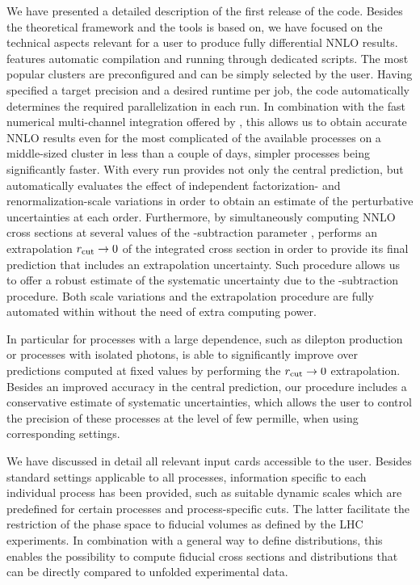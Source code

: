 \documentclass[english,11pt]{article}
\begin{document}
We have presented a detailed description of the first release of 
the \Matrix{} code. 
Besides the theoretical framework and the tools \Matrix{} is based on, we have 
focused on the technical aspects relevant for a user to produce fully differential 
NNLO results. \Matrix{} features automatic compilation and running through dedicated scripts. The most 
popular clusters are preconfigured and can be simply selected by the user. Having specified 
a target precision and a desired runtime per job, the code automatically determines
the required parallelization in each run. In combination with the fast numerical multi-channel 
integration offered by \Munich{}, this allows us
to obtain accurate NNLO results even for the most complicated 
of the available processes on a middle-sized cluster in less than a couple of days, 
simpler processes being significantly faster. With every run \Matrix{} provides not 
only the central prediction, but automatically evaluates the effect of independent factorization- and renormalization-scale 
variations in order to obtain an estimate of the perturbative uncertainties at each order.
Furthermore, by simultaneously computing NNLO cross sections at several values of the \qt{}-subtraction 
parameter \rcut{}, \Matrix{} performs an extrapolation $r_{\mathrm{cut}}\rightarrow 0$ of the integrated cross section 
in order to provide its final prediction that includes an extrapolation uncertainty.
Such procedure allows us to offer a robust estimate of the systematic uncertainty due to the \qt{}-subtraction procedure.
Both scale variations and the \rcut{} extrapolation procedure are fully automated within \Matrix{} 
without the need of extra computing power.

In particular for processes with a large \rcut{} dependence, such as dilepton production
or processes with isolated photons, 
\Matrix{} is able to significantly improve over predictions computed at fixed \rcut{} values by performing the $r_{\mathrm{cut}}\to 0$ extrapolation. 
Besides an improved accuracy in the central prediction, our procedure includes a conservative estimate 
of systematic uncertainties, which allows the user to control the precision of these processes at the level 
of few permille, when using corresponding settings.

We have discussed in detail all 
relevant \Matrix{} input cards accessible to the user. Besides standard settings 
applicable to all processes, information specific to each individual process 
has been provided, such as suitable dynamic scales which are predefined for 
certain processes and process-specific cuts. The latter facilitate the restriction 
of the phase space to fiducial volumes as defined by the LHC experiments. 
In combination with a general way to define distributions, this enables 
the possibility to compute fiducial cross sections and distributions that
can be directly compared to unfolded experimental data.
\end{document}
